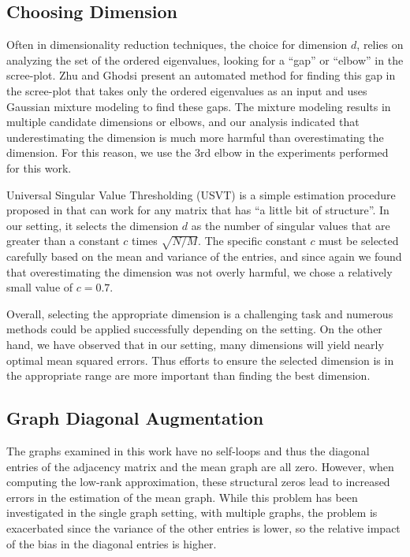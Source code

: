 \documentclass[10pt,letterpaper]{article}
\begin{document}
\subsection{Choosing Dimension}
\label{section:dim_select}
Often in dimensionality reduction techniques, the choice for dimension $d$, relies on analyzing the set of the ordered eigenvalues, looking for a ``gap'' or ``elbow'' in the scree-plot. Zhu and Ghodsi \cite{zhu2006automatic} present an automated method for finding this gap in the scree-plot that takes only the ordered eigenvalues as an input and uses Gaussian mixture modeling to find these gaps.
The mixture modeling results in multiple candidate dimensions or elbows, and our analysis indicated that underestimating the dimension is much more harmful than overestimating the dimension.
For this reason, we use the 3rd elbow in the experiments performed for this work.

Universal Singular Value Thresholding (USVT) is a simple estimation procedure proposed in \cite{chatterjee2015matrix} that can work for any matrix that has ``a little bit of structure''. 
In our setting, it selects the dimension $d$ as the number of singular values that are greater than a constant $c$ times $\sqrt{N/M}$.
The specific constant $c$ must be selected carefully based on the mean and variance of the entries, and since again we found that overestimating the dimension was not overly harmful, we chose a relatively small value of $c=0.7$.

Overall, selecting the appropriate dimension is a challenging task and numerous methods could be applied successfully depending on the setting.
On the other hand, we have observed that in our setting, many dimensions will yield nearly optimal mean squared errors. 
Thus efforts to ensure the selected dimension is in the appropriate range are more important than finding the best dimension.



\subsection{Graph Diagonal Augmentation}
\label{section:diag_aug}
The graphs examined in this work have no self-loops and thus the diagonal entries of the adjacency matrix and the mean graph are all zero.
However, when computing the low-rank approximation, these structural zeros lead to increased errors in the estimation of the mean graph. 
While this problem has been investigated in the single graph setting, with multiple graphs, the problem is exacerbated since the variance of the other entries is lower, so the relative impact of the bias in the diagonal entries is higher.
\end{document}
